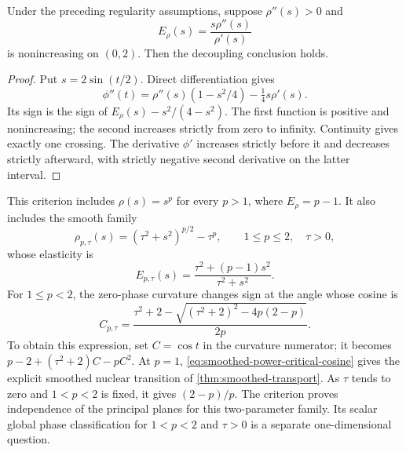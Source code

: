 \begin{corollary}
\label{cor:spectral-penalty-elasticity}
Under the preceding regularity assumptions, suppose $\rho''(s)>0$ and
\[
 E_\rho(s)=\frac{s\rho''(s)}{\rho'(s)}
\]
is nonincreasing on $(0,2)$. Then the decoupling conclusion holds.
\end{corollary}

\begin{proof}
Put $s=2\sin(t/2)$. Direct differentiation gives
\[
 \phi''(t)=\rho''(s)(1-s^2/4)-\tfrac14s\rho'(s).
\]
Its sign is the sign of
$E_\rho(s)-s^2/(4-s^2)$. The first function is positive and
nonincreasing; the second increases strictly from zero to infinity.
Continuity gives exactly one crossing. The derivative $\phi'$ increases
strictly before it and decreases strictly afterward, with strictly
negative second derivative on the latter interval.
\end{proof}

This criterion includes $\rho(s)=s^p$ for every $p>1$, where
$E_\rho=p-1$. It also includes the smooth family
\[
 \rho_{p,\tau}(s)=(\tau^2+s^2)^{p/2}-\tau^p,
 \qquad 1\leq p\leq2,\quad\tau>0,
\]
whose elasticity is
\[
 E_{p,\tau}(s)=\frac{\tau^2+(p-1)s^2}{\tau^2+s^2}.
\]
For $1\leq p<2$, the zero-phase curvature changes sign at the angle
whose cosine is
\begin{equation}
 C_{p,\tau}=
 \frac{\tau^2+2-\sqrt{(\tau^2+2)^2-4p(2-p)}}{2p}.
 \label{eq:smoothed-power-critical-cosine}
\end{equation}
To obtain this expression, set $C=\cos t$ in the curvature numerator;
it becomes $p-2+(\tau^2+2)C-pC^2$. At $p=1$,
\cref{eq:smoothed-power-critical-cosine} gives the explicit smoothed
nuclear transition of \cref{thm:smoothed-transport}. As $\tau$ tends
to zero and $1<p<2$ is fixed, it gives $(2-p)/p$.
The criterion proves independence of the principal planes for this
two-parameter family. Its scalar global phase classification for
$1<p<2$ and $\tau>0$ is a separate one-dimensional question.
